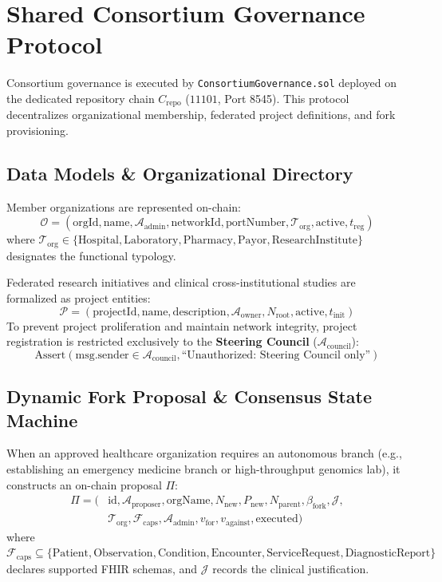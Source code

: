 \documentclass[journal]{IEEEtran}
\theoremstyle{definition}
\begin{document}
\section{Shared Consortium Governance Protocol}
Consortium governance is executed by \texttt{ConsortiumGovernance.sol} deployed on the dedicated repository chain $C_{\text{repo}}$ ($11101$, Port 8545). This protocol decentralizes organizational membership, federated project definitions, and fork provisioning.

\subsection{Data Models \& Organizational Directory}
Member organizations are represented on-chain:
\begin{equation}
\mathcal{O} = (\text{orgId}, \text{name}, \mathcal{A}_{\text{admin}}, \text{networkId}, \text{portNumber}, \mathcal{T}_{\text{org}}, \text{active}, t_{\text{reg}})
\end{equation}
where $\mathcal{T}_{\text{org}} \in \{\text{Hospital}, \text{Laboratory}, \text{Pharmacy}, \text{Payor}, \text{ResearchInstitute}\}$ designates the functional typology.

Federated research initiatives and clinical cross-institutional studies are formalized as project entities:
\begin{equation}
\mathcal{P} = (\text{projectId}, \text{name}, \text{description}, \mathcal{A}_{\text{owner}}, N_{\text{root}}, \text{active}, t_{\text{init}})
\end{equation}
To prevent project proliferation and maintain network integrity, project registration is restricted exclusively to the \textbf{Steering Council} ($\mathcal{A}_{\text{council}}$):
\begin{equation}
\text{Assert}\left(\text{msg.sender} \in \mathcal{A}_{\text{council}}, \text{``Unauthorized: Steering Council only''}\right)
\end{equation}

\subsection{Dynamic Fork Proposal \& Consensus State Machine}
When an approved healthcare organization requires an autonomous branch (e.g., establishing an emergency medicine branch or high-throughput genomics lab), it constructs an on-chain proposal $\Pi$:
\begin{equation}
\begin{aligned}
\Pi = (& \text{id}, \mathcal{A}_{\text{proposer}}, \text{orgName}, N_{\text{new}}, P_{\text{new}}, N_{\text{parent}}, \beta_{\text{fork}}, \mathcal{J}, \\
       & \mathcal{T}_{\text{org}}, \mathcal{F}_{\text{caps}}, \mathcal{A}_{\text{admin}}, v_{\text{for}}, v_{\text{against}}, \text{executed} )
\end{aligned}
\end{equation}
where $\mathcal{F}_{\text{caps}} \subseteq \{\text{Patient}, \text{Observation}, \text{Condition}, \text{Encounter}, \text{ServiceRequest}, \text{DiagnosticReport}\}$ declares supported FHIR schemas, and $\mathcal{J}$ records the clinical justification.
\end{document}
